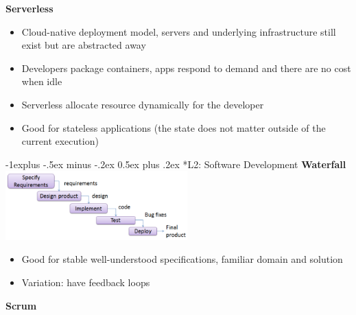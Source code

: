 \documentclass[10pt, landscape]{article}
\makeatletter
\renewcommand{\subsection}{\@startsection{subsection}{2}{0mm}%
                                {-1explus -.5ex minus -.2ex}%
                                {0.5ex plus .2ex}%
                                {\normalfont\normalsize\bfseries}}
\makeatother
\begin{document}
\begin{multicols}{4}
\textbf{Serverless}
\begin{itemize}
  \item Cloud-native deployment model, servers and underlying infrastructure still exist but are abstracted away
  \item Developers package containers, apps respond to demand and there are no cost when idle
  \item Serverless allocate resource dynamically for the developer
  \item Good for stateless applications (the state does not matter outside of the current execution)
\end{itemize}

\subsection*{L2: Software Development}
\textbf{Waterfall}
\includegraphics*[width=7cm]{waterfall}
\begin{itemize}
  \item Good for stable well-understood specifications, familiar domain and solution 
  \item Variation: have feedback loops
\end{itemize}

\textbf{Scrum}


\end{multicols}
\end{document}
